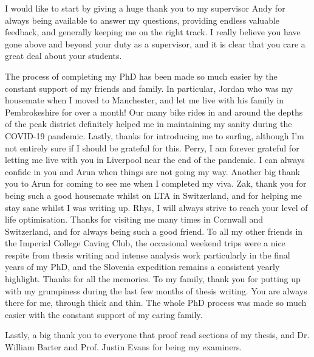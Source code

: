 
\uomdeclarations %

\begin{uomacknowledgements} %
  I would like to start by giving a huge thank you to my supervisor Andy for always being available to answer my questions, providing endless valuable feedback, and generally keeping me on the right track. I really believe you have gone above and beyond your duty as a supervisor, and it is clear that you care a great deal about your students.

  The process of completing my PhD has been made so much easier by the constant support of my friends and family. In particular, Jordan who was my housemate when I moved to Manchester, and let me live with his family in Pembrokeshire for over a month! Our many bike rides in and around the depths of the peak district definitely helped me in maintaining my sanity during the COVID-19 pandemic. Lastly, thanks for introducing me to surfing, although I'm not entirely sure if I should be grateful for this. Perry, I am forever grateful for letting me live with you in Liverpool near the end of the pandemic. I can always confide in you and Arun when things are not going my way. Another big thank you to Arun for coming to see me when I completed my viva. Zak, thank you for being such a good housemate whilst on LTA in Switzerland, and for helping me stay sane whilst I was writing up. Rhys, I will always strive to reach your level of life optimisation. Thanks for visiting me many times in Cornwall and Switzerland, and for always being such a good friend. To all my other friends in the Imperial College Caving Club, the occasional weekend trips were a nice respite from thesis writing and intense analysis work particularly in the final years of my PhD, and the Slovenia expedition remains a consistent yearly highlight. Thanks for all the memories. To my family, thank you for putting up with my grumpiness during the last few months of thesis writing. You are always there for me, through thick and thin. The whole PhD process was made so much easier with the constant support of my caring family.

  Lastly, a big thank you to everyone that proof read sections of my thesis, and Dr. William Barter and Prof. Justin Evans for being my examiners.
\end{uomacknowledgements}


